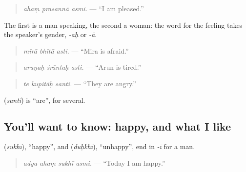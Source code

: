 \begin{quote}
\emph{ahaṃ prasannā asmi.} — \textquotedblleft{}I am pleased.\textquotedblright{}
\end{quote}

The first is a man speaking, the second a woman: the word for the feeling takes the speaker's gender, \emph{-aḥ} or \emph{-ā}.

\begin{quote}
\textbf{  }
\end{quote}

\begin{quote}
\emph{mīrā bhītā asti.} — \textquotedblleft{}Mira is afraid.\textquotedblright{}
\end{quote}

\begin{quote}
\textbf{  }
\end{quote}

\begin{quote}
\emph{aruṇaḥ śrāntaḥ asti.} — \textquotedblleft{}Arun is tired.\textquotedblright{}
\end{quote}

\begin{quote}
\textbf{  }
\end{quote}

\begin{quote}
\emph{te kupitāḥ santi.} — \textquotedblleft{}They are angry.\textquotedblright{}
\end{quote}

\textbf{} (\emph{santi}) is \textquotedblleft{}are\textquotedblright{}, for several.

\subsection*{You'll want to know: happy, and what I like}
\textbf{} (\emph{sukhī}), \textquotedblleft{}happy\textquotedblright{}, and \textbf{} (\emph{duḥkhī}), \textquotedblleft{}unhappy\textquotedblright{}, end in \emph{-ī} for a man.

\begin{quote}
\textbf{   }
\end{quote}

\begin{quote}
\emph{adya ahaṃ sukhī asmi.} — \textquotedblleft{}Today I am happy.\textquotedblright{}
\end{quote}

